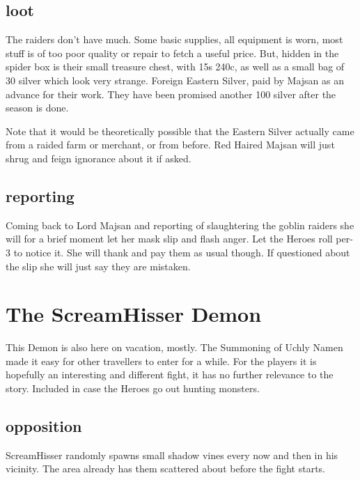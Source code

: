 \subsection*{loot}
The raiders don't have much. Some basic supplies, all equipment is worn, most stuff is of too poor quality or repair to fetch a useful price. But, hidden in the spider box is their small treasure chest, with 15s 240c, as well as a small bag of 30 silver which look very strange. Foreign Eastern Silver, paid by Majsan as an advance for their work. They have been promised another 100 silver after the season is done.

Note that it would be theoretically possible that the Eastern Silver actually came from a raided farm or merchant, or from before. Red Haired Majsan will just shrug and feign ignorance about it if asked.


\subsection*{reporting}
Coming back to Lord Majsan and reporting of slaughtering the goblin raiders she will for a brief moment let her mask slip and flash anger. Let the Heroes roll per-3 to notice it. She will thank and pay them as usual though. If questioned about the slip she will just say they are mistaken.









\section*{The ScreamHisser Demon}
This Demon is also here on vacation, mostly. The Summoning of Uchly Namen made it easy for other travellers to enter for a while.
For the players it is hopefully an interesting and different fight, it has no further relevance to the story. Included in case the Heroes go out hunting monsters.


\subsection*{opposition}
ScreamHisser randomly spawns small shadow vines every now and then in his vicinity. The area already has them scattered about before the fight starts.

